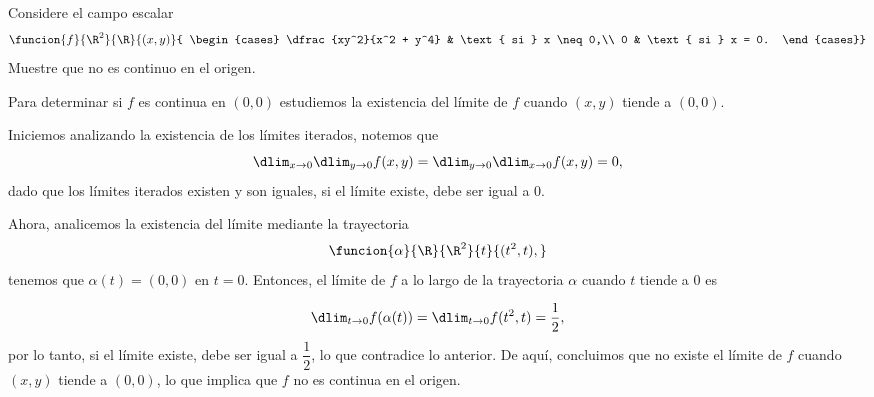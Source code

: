 \documentclass[a4,11pt]{aleph-examen}
\begin{document}
\begin{preguntas}
\begin{respuesta}
    
    

\item 
    Considere el campo escalar
    \[
        \funcion{f}{\R^2}{\R}{(x,y)}{
        \begin{cases}
            \dfrac{xy^2}{x^2 + y^4} & \text{ si } x \neq 0,\\
            0 & \text{ si } x = 0.
        \end{cases}}
    \]
    Muestre que no es continuo en el origen.
    
\begin{respuesta}
    Para determinar si $f$ es continua en $(0,0)$ estudiemos la existencia del límite de $f$ cuando $(x,y)$ tiende a $(0,0)$.
    
    Iniciemos analizando la existencia de los límites iterados, notemos que
    \[
        \dlim_{x\to 0}\dlim_{y\to 0}f(x,y)=\dlim_{y\to 0}\dlim_{x\to 0}f(x,y)=0,
    \]
    dado que los límites iterados existen y son iguales, si el límite existe, debe ser igual a 0.
    
    Ahora, analicemos la existencia del límite mediante la trayectoria
    \[
        \funcion{\alpha}{\R}{\R^2}{t}{(t^2,t),}
    \]
    tenemos que $\alpha(t)=(0,0)$ en $t=0$. Entonces, el límite de $f$ a lo largo de la trayectoria $\alpha$ cuando $t$ tiende a 0 es
    
    \[
        \dlim_{t\to0}{f(\alpha(t))}=\dlim_{t\to0}{f(t^2,t)}=\dfrac{1}{2},
    \]
    por lo tanto, si el límite existe, debe ser igual a $\dfrac{1}{2}$, lo que contradice lo anterior. De aquí, concluimos que no existe el límite de $f$ cuando $(x,y)$ tiende a $(0,0)$, lo que implica que $f$ no es continua en el origen.
\end{respuesta}


\end{respuesta}
\end{preguntas}
\end{document}
